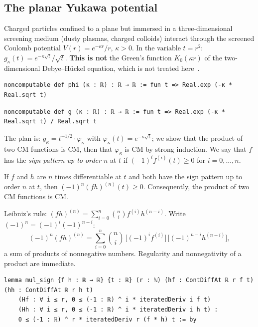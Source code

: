 \subsection{The planar Yukawa potential}\label{ch2:ssec:yuk}

\begin{physbox}
Charged particles confined to a plane but immersed in a three-dimensional screening medium (dusty plasmas, charged
colloids) interact through the screened Coulomb potential $V(r)=e^{-\kappa r}/r$, $\kappa>0$.
In the variable $t=r^2$: $g_\kappa(t)=e^{-\kappa\sqrt t}/\sqrt t$. \textbf{This is not} the Green's function
$K_0(\kappa r)$ of the two-dimensional Debye--Hückel equation, which is not treated here~\cite{ch2yuk}.
\end{physbox}
\begin{leanbox}
\begin{lstlisting}[style=chdeux]
noncomputable def phi (κ : ℝ) : ℝ → ℝ := fun t => Real.exp (-κ * Real.sqrt t)
\end{lstlisting}
\begin{lstlisting}[style=chdeux]
noncomputable def g (κ : ℝ) : ℝ → ℝ := fun t => Real.exp (-κ * Real.sqrt t) / Real.sqrt t
\end{lstlisting}
\end{leanbox}

The plan is: $g_\kappa=t^{-1/2}\cdot\varphi_\kappa$ with $\varphi_\kappa(t)=e^{-\kappa\sqrt t}$; we show that the
product of two CM functions is CM, then that $\varphi_\kappa$ is CM by strong induction. We say that $f$ has the
\emph{sign pattern up to order $n$} at $t$ if $(-1)^if^{(i)}(t)\ge0$ for $i=0,\dots,n$.

\begin{lemma}\label{ch2:lem:leibniz}
If $f$ and $h$ are $n$ times differentiable at $t$ and both have the sign pattern up to order $n$ at $t$, then
$(-1)^n(fh)^{(n)}(t)\ge0$. Consequently, the product of two CM functions is CM.
\end{lemma}
\begin{humanproof}
Leibniz's rule: $(fh)^{(n)}=\sum_{i=0}^n\binom ni f^{(i)}h^{(n-i)}$. Write $(-1)^n=(-1)^i(-1)^{n-i}$:
\[(-1)^n(fh)^{(n)}=\sum_{i=0}^n\binom ni\,\bigl[(-1)^if^{(i)}\bigr]\,\bigl[(-1)^{n-i}h^{(n-i)}\bigr],\]
a sum of products of nonnegative numbers. Regularity and nonnegativity of a product are immediate.
\end{humanproof}
\begin{leanbox}
\begin{lstlisting}[style=chdeux]
lemma mul_sign {f h : ℝ → ℝ} {t : ℝ} (r : ℕ) (hf : ContDiffAt ℝ r f t) (hh : ContDiffAt ℝ r h t)
    (Hf : ∀ i ≤ r, 0 ≤ (-1 : ℝ) ^ i * iteratedDeriv i f t)
    (Hh : ∀ i ≤ r, 0 ≤ (-1 : ℝ) ^ i * iteratedDeriv i h t) :
    0 ≤ (-1 : ℝ) ^ r * iteratedDeriv r (f * h) t := by
\end{lstlisting}
\end{leanbox}

